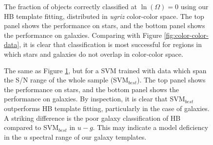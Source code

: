 \documentclass[12pt,preprint]{aastex}
\begin{document}

\begin{figure}
\centering
\caption{The fraction of objects correctly classified at
  $\ln(\Omega)=0$ using our HB template fitting, distributed in {\it
    ugriz} color-color space.  The top panel shows the performance on stars, and the bottom panel shows the performance on galaxies.  Comparing with Figure
  \ref{fig:color-color-data}, it is clear that classification is most
  successful for regions in which stars and galaxies do not overlap in
  color-color space.}
\label{fig:color-color-hb-fraction}
\end{figure}

\begin{figure}
\centering
\caption{The same as Figure \ref{fig:color-color-hb-fraction}, but for
  a SVM trained with data which span the S/N range of the whole sample
  (SVM$_{best}$).    The top panel shows the performance on stars, and the bottom panel shows the performance on galaxies.  By inspection, it is clear that SVM$_{best}$
  outperforms HB template fitting, particularly in the case of
  galaxies.  A striking difference is the poor galaxy classification
  of HB compared to SVM$_{best}$ in $u-g$.  This may indicate a model
  deficiency in the $u$ spectral range of our galaxy templates.}
\label{fig:color-color-svm-fraction}
\end{figure}
\end{document}
